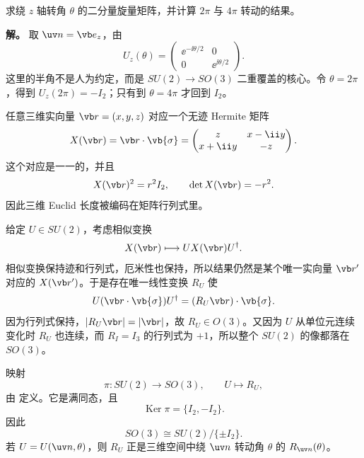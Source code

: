 \begin{example}[{$z$ 轴转动的旋量矩阵}]
求绕 $z$ 轴转角 $\theta$ 的二分量旋量矩阵，并计算 $2\pi$ 与 $4\pi$ 转动的结果。

\textbf{解。} 取 $\uv n=\vb e_z$，由 
\[
U_z(\theta)=
\begin{pmatrix}
\ee^{-\ii\theta/2}&0\\
0&\ee^{\ii\theta/2}
\end{pmatrix}.
\]
这里的半角不是人为约定，而是 $SU(2)\to SO(3)$ 二重覆盖的核心。令 $\theta=2\pi$，得到 $U_z(2\pi)=-I_2$；只有到 $\theta=4\pi$ 才回到 $I_2$。
\end{example}

任意三维实向量 $\vb r=(x,y,z)$ 对应一个无迹 Hermite 矩阵
\begin{equation}
X(\vb r)=\vb r\cdot\vb{\sigma}
=\begin{pmatrix}
z&x-\ii y\\x+\ii y&-z
\end{pmatrix}.
\label{eq:vector-pauli-map}
\end{equation}
这个对应是一一的，并且
\[
X(\vb r)^2=r^2I_2,
\qquad
\det X(\vb r)=-r^2.
\]
因此三维 Euclid 长度被编码在矩阵行列式里。

给定 $U\in SU(2)$，考虑相似变换
\[
X(\vb r)\longmapsto UX(\vb r)U^\dagger.
\]
相似变换保持迹和行列式，厄米性也保持，所以结果仍然是某个唯一实向量 $\vb r'$ 对应的 $X(\vb r')$。于是存在唯一线性变换 $R_U$ 使
\begin{equation}
U(\vb r\cdot\vb{\sigma})U^\dagger
=(R_U\vb r)\cdot\vb{\sigma}.
\label{eq:su2-to-so3-map}
\end{equation}
因为行列式保持，$\lvert R_U\vb r\rvert=\lvert\vb r\rvert$，故 $R_U\in O(3)$。又因为 $U$ 从单位元连续变化时 $R_U$ 也连续，而 $R_I=I_3$ 的行列式为 $+1$，所以整个 $SU(2)$ 的像都落在 $SO(3)$。

\begin{theorem}[$SU(2)$ 到 $SO(3)$ 的二重覆盖]
映射
\[
\pi:SU(2)\longrightarrow SO(3),
\qquad
U\longmapsto R_U,
\]
由  定义。它是满同态，且
\[
\operatorname{Ker}\pi=\{I_2,-I_2\}.
\]
因此
\begin{equation}
SO(3)\cong SU(2)/\{\pm I_2\}.
\label{eq:so3-su2-quotient}
\end{equation}
若 $U=U(\uv n,\theta)$，则 $R_U$ 正是三维空间中绕 $\uv n$ 转动角 $\theta$ 的 $R_{\uv n}(\theta)$。

\end{theorem}

